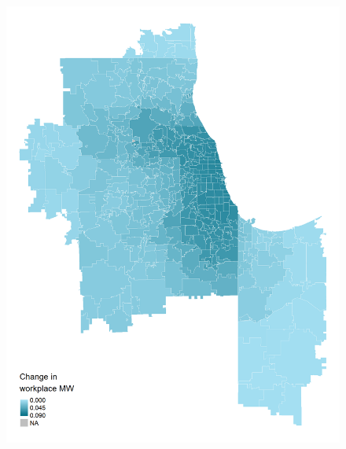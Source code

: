 \documentclass[aspectratio=169, t]{beamer}
\begin{document}
\begin{frame}[label = chi_example]
\begin{columns}
\begin{column}{0.50\textwidth}
\begin{figure}
                \includegraphics[scale = 0.35]{maps_events/output/chicago2019-6_wkp_mw.png}
            \end{figure}   
        \end{column}
    \end{columns}
    \vspace{3mm}
    \hyperlink{nyc_example}{} 
    \hyperlink{bay_example}{}
    \hyperlink{san_diego_example}{}
    \hyperlink{kc_example}{}
\end{frame}
\end{document}
